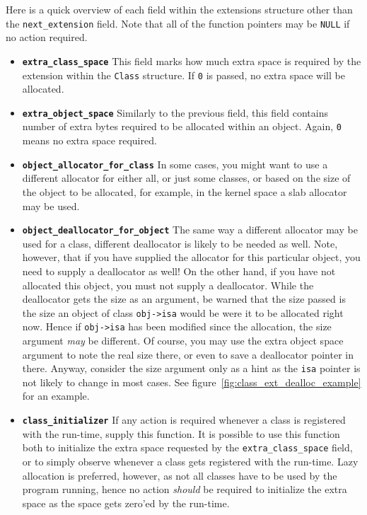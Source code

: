 Here is a quick overview of each field within the extensions structure other than the \verb=next_extension= field. Note that all of the function pointers may be \texttt{NULL} if no action required.

\begin{itemize}
  \item{\bf{\tt{extra\_class\_space}}} This field marks how much extra space is required by the extension within the \texttt{Class} structure. If \texttt{0} is passed, no extra space will be allocated.
  \item{\bf{\tt{extra\_object\_space}}} Similarly to the previous field, this field contains number of extra bytes required to be allocated within an object. Again, \texttt{0} means no extra space required.
  \item{\bf{\tt{object\_allocator\_for\_class}}} In some cases, you might want to use a different allocator for either all, or just some classes, or based on the size of the object to be allocated, for example, in the kernel space a slab allocator may be used.
  \item{\bf{\tt{object\_deallocator\_for\_object}}} The same way a different allocator may be used for a class, different deallocator is likely to be needed as well. Note, however, that if you have supplied the allocator for this particular object, you need to supply a deallocator as well! On the other hand, if you have not allocated this object, you must not supply a deallocator.
  While the deallocator gets the size as an argument, be warned that the size passed is the size an object of class \verb=obj->isa= would be were it to be allocated right now. Hence if \verb=obj->isa= has been modified since the allocation, the size argument \emph{may} be different. Of course, you may use the extra object space argument to note the real size there, or even to save a deallocator pointer in there. Anyway, consider the size argument only as a hint as the \verb=isa= pointer is not likely to change in most cases.
  See figure~\ref{fig:class_ext_dealloc_example} for an example.
  \item{\bf{\tt{class\_initializer}}} If any action is required whenever a class is registered with the run-time, supply this function. It is possible to use this function both to initialize the extra space requested by the \texttt{extra\_class\_space} field, or to simply observe whenever a class gets registered with the run-time. Lazy allocation is preferred, however, as not all classes have to be used by the program running, hence no action \emph{should} be required to initialize the extra space as the space gets zero'ed by the run-time.

\end{itemize}
